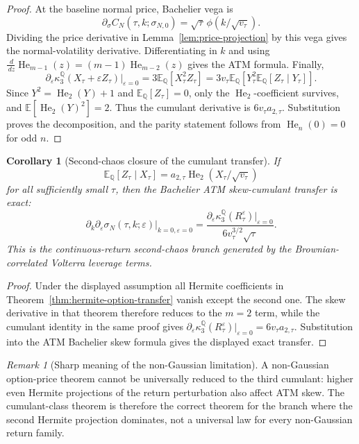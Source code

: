 \documentclass[11pt,a4paper]{amsart}
\theoremstyle{plain}
\newtheorem{corollary}[theorem]{Corollary}
\theoremstyle{definition}
\theoremstyle{remark}
\newtheorem{remark}[theorem]{Remark}
\DeclareMathOperator{\He}{He}
\newcommand{\QQ}{\mathbb{Q}}
\newcommand{\EE}{\mathbb{E}}
\newcommand{\dd}{\,d}
\begin{document}
\begin{proof}
At the baseline normal price, Bachelier vega is
\[
        \partial_\sigma C_N(\tau,k;\sigma_{N,0})
        =
        \sqrt\tau\,\phi(k/\sqrt{v_\tau}).
\]
Dividing the price derivative in Lemma~\ref{lem:price-projection} by this vega gives the
normal-volatility derivative.  Differentiating in \(k\) and using
\(\frac{\dd}{\dd z}\He_{m-1}(z)=(m-1)\He_{m-2}(z)\) gives the ATM formula.  Finally,
\[
        \partial_\varepsilon\kappa_3^\QQ(X_\tau+\varepsilon Z_\tau)|_{\varepsilon=0}
        =
        3\EE_\QQ[X_\tau^2Z_\tau]
        =
        3v_\tau\EE_\QQ[Y_\tau^2\EE_\QQ[Z_\tau\mid Y_\tau]].
\]
Since \(Y^2=\He_2(Y)+1\) and \(\EE_\QQ[Z_\tau]=0\), only the \(\He_2\)-coefficient survives, and
\(\EE[\He_2(Y)^2]=2\).  Thus the cumulant derivative is \(6v_\tau a_{2,\tau}\).  Substitution
proves the decomposition, and the parity statement follows from \(\He_n(0)=0\) for odd \(n\).
\end{proof}

\begin{corollary}[Second-chaos closure of the cumulant transfer]\label{cor:second-chaos-closure}
If
\[
        \EE_\QQ[Z_\tau\mid X_\tau]=a_{2,\tau}\He_2(X_\tau/\sqrt{v_\tau})
\]
for all sufficiently small \(\tau\), then the Bachelier ATM skew-cumulant transfer is exact:
\[
        \partial_k\partial_\varepsilon\sigma_N(\tau,k;\varepsilon)\big|_{k=0,\varepsilon=0}
        =
        \frac{\partial_\varepsilon \kappa_3^\QQ(R_\tau^\varepsilon)|_{\varepsilon=0}}
        {6v_\tau^{3/2}\sqrt\tau}.
\]
This is the continuous-return second-chaos branch generated by the Brownian-correlated Volterra
leverage terms.
\end{corollary}

\begin{proof}
Under the displayed assumption all Hermite coefficients in Theorem~\ref{thm:hermite-option-transfer} vanish
except the second one.  The skew derivative in that theorem therefore reduces to the
\(m=2\) term, while the cumulant identity in the same proof gives
\(\partial_\varepsilon\kappa_3^\QQ(R_\tau^\varepsilon)|_{\varepsilon=0}=6v_\tau a_{2,\tau}\).  Substitution
into the ATM Bachelier skew formula gives the displayed exact transfer.
\end{proof}

\begin{remark}[Sharp meaning of the non-Gaussian limitation]\label{rem:ng-hermite-obstruction}
A non-Gaussian option-price theorem cannot be universally reduced to the third cumulant: higher
even Hermite projections of the return perturbation also affect ATM skew.  The cumulant-class
theorem is therefore the correct theorem for the branch where the second Hermite projection
dominates, not a universal law for every non-Gaussian return family.
\end{remark}
\end{document}
